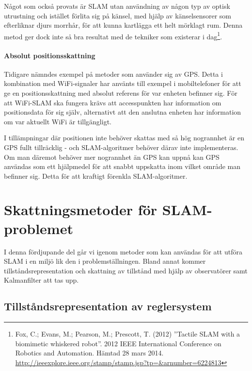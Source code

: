 \documentclass[a4paper,12pt,fleqn]{article}
\begin{document}
Något som också provats är SLAM utan användning av någon typ av optisk utrustning och istället förlita sig på känsel, med hjälp av känselsensorer som efterliknar djurs morrhår, för att kunna kartlägga ett helt mörklagt rum. Denna metod ger dock inte så bra resultat med de tekniker som existerar i dag\footnote{Fox, C.; Evans, M.; Pearson, M.; Prescott, T. (2012)
''Tactile SLAM with a biomimetic whiskered robot''. 2012 IEEE International Conference on Robotics and Automation. Hämtad 28 mars 2014.
\url{http://ieeexplore.ieee.org/stamp/stamp.jsp?tp=&arnumber=6224813}
}. 

\paragraph{Absolut positionsskattning}Tidigare nämndes exempel på metoder som använder sig av GPS. Detta i kombination med WiFi-signaler har använts till exempel i mobiltelefoner för att ge en positionsskattning med absolut referens för var enheten befinner sig. För att WiFi-SLAM ska fungera krävs att accesspunkten har information om positionsdata för sig själv, alternativt att den anslutna enheten har information om var aktuellt WiFi är tillgängligt.

I tillämpningar där positionen inte behöver skattas med så hög nogrannhet är en GPS fullt tillräcklig - och SLAM-algoritmer behöver därav inte implementeras. Om man däremot behöver mer nogrannhet än GPS kan uppnå kan GPS användas som ett hjälpmedel för att snabbt uppskatta inom vilket område man befinner sig. Detta för att kraftigt förenkla SLAM-algoritmer. 


\newpage
\section{Skattningsmetoder för SLAM-problemet}
I denna fördjupande del går vi igenom metoder som kan användas för att utföra SLAM i en miljö lik den i problemställningen. Bland annat kommer tillståndsrepresentation och skattning av tillstånd med hjälp av observatörer samt Kalmanfilter att tas upp.


\subsection{Tillståndsrepresentation av reglersystem}
\end{document}

